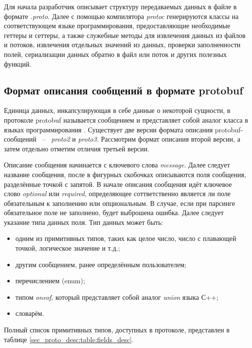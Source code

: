 Для начала разработчик описывает структуру передаваемых данных в файле в формате \textit{.proto}. 
Далее с помощью компилятора \textit{protoc} генерируются классы на соответствующем языке программирования, предоставляющие необходимые геттеры и сеттеры,
а также служебные методы для извлечения данных из файлов и потоков, извлечения отдельных значений из данных, 
проверки заполненности полей, сериализации данных обратно в файл или поток и других полезных функций.

\subsection{Формат описания сообщений в формате protobuf}

Единица данных, инкапсулирующая в себе данные о некоторой сущности, в протоколе protobuf называется 
сообщением и представляет собой аналог класса в языках программирования \cite{protobuf_api}.
Существует две версии формата описания protobuf-сообщений ~--~ \textit{proto2} и \textit{proto3}. Рассмотрим формат описания второй версии, а затем отдельно отметим отличия третьей версии.

Описание сообщения начинается с ключевого слова \textit{message}. Далее следует название сообщения, после в фигурных скобочках описываются поля сообщения, разделённые точкой с запятой.
В начале описания сообщения идёт ключевое слово \textit{optional} или \textit{required}, определяющее соттветственно является ли поле обязательным к заполнению или опциональным. В случае, если при парсинге обязательное поле не заполнено, будет выброшена ошибка. Далее следует указание типа данных поля. Тип данных может быть:
\begin{itemize}
    \item одним из примитивных типов, таких как целое число, число с плавающей точкой, логическое значение и т.д.;
    \item другим сообщением, ранее определённым пользователем;
    \item перечислением (enum);
    \item типом \textit{oneof}, который представляет собой аналог \textit{union} языка С++;
    \item словарём.
\end{itemize}

Полный список примитивных типов, доступных в протоколе, представлен в таблице \ref{sec_proto_desc:table:fields_desc}.

